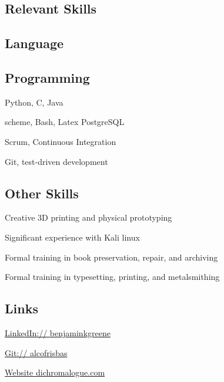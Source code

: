 \documentclass{cv}
\begin{document}
{}
\noindent{}
\begin{paracol}{2}
\begin{raggedright}
\section{Relevant Skills}
\subsection{Language}
\subsection{Programming}
\begin{closeitems}
\item Python, C, Java
\item scheme, Bash, Latex PostgreSQL
\item Scrum, Continuous Integration
\item Git, test-driven development
\end{closeitems}
\subsection{Other Skills}
\begin{closeitems}
\item Creative 3D printing and physical prototyping
\item Significant experience with Kali linux
\item Formal training in book preservation, repair, and archiving
\item Formal training in typesetting, printing, and metalsmithing
\end{closeitems}
\subsection{Links}
\begin{closeitems}
\item \href{http://www.linkedin.com/in/benjaminkgreene}{LinkedIn:// \small{benjaminkgreene}}
\item \href{http://www.github.com/alcofrisbas}{Git:// \small{alcofrisbas}}
\item \href{http://www.dichromalogue.com}{Website \small{dichromalogue.com}}
\end{closeitems}

\end{raggedright}
\end{paracol}
\end{document}
